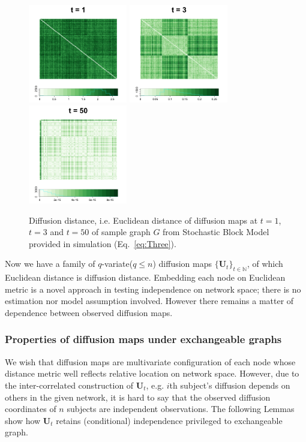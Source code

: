 \documentclass[12pt]{article}
\theoremstyle{definition}
\begin{document}
\begin{figure}[H]
	\centering
	\includegraphics[width=1.7in]{../Figure/Dx1.png}
	\includegraphics[width=1.7in]{../Figure/Dx3.png}
	\includegraphics[width=1.7in]{../Figure/Dx50.png}
	\caption{Diffusion distance, i.e. Euclidean distance of diffusion maps at $t=1$, $t=3$  and $t=50$ of sample graph $G$ from Stochastic Block Model provided in simulation (Eq.~\ref{eq:Three}).}
	\label{fig:diffusions}
\end{figure}

Now we have  a family of $q$-variate($q \leq n$) diffusion maps $\{ \mathbf{U}_{t} \}_{t \in \mathbb{N}} $, of which Euclidean distance is diffusion distance. Embedding each node on Euclidean metric is a novel approach in testing independence on network space; there is no estimation nor model assumption involved. However there remains a matter of dependence between observed diffusion maps. 
	
\subsubsection{Properties of diffusion maps under exchangeable graphs}

We wish that diffusion maps are multivariate configuration of each node whose distance metric well reflects relative location on network space. However, due to the inter-correlated construction of $\mathbf{U}_{t}$, e.g. $i$th subject's diffusion depends on others in the given network, it is hard to say that the observed diffusion coordinates of $n$ subjects are independent observations. The following Lemmas show how $\mathbf{U}_{t}$ retains (conditional) independence privileged to exchangeable graph. 
\end{document}
